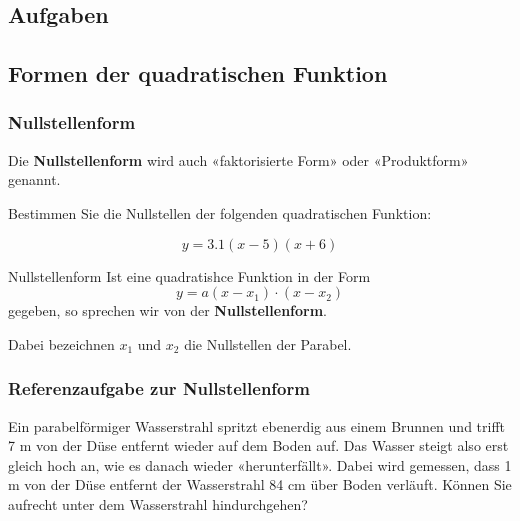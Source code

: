 \subsection*{Aufgaben}

\newpage

\subsection{Formen der quadratischen Funktion}
\subsubsection{Nullstellenform}

Die \textbf{Nullstellenform} wird auch  «faktorisierte Form» oder
«Produktform» genannt.

Bestimmen Sie die Nullstellen der folgenden quadratischen Funktion:

$$y = 3.1(x-5)(x+6)$$





\begin{gesetz}{Nullstellenform}{}
Ist eine quadratishce Funktion in der Form
$$y = a(x-x_1)\cdot{}(x-x_2)$$
gegeben, so sprechen wir von der \textbf{Nullstellenform}.

Dabei bezeichnen  $x_1$ und $x_2$ die Nullstellen der Parabel.
  \end{gesetz}

\newpage


\subsubsection*{Referenzaufgabe zur Nullstellenform}


Ein parabelförmiger Wasserstrahl spritzt ebenerdig aus einem Brunnen
und trifft 7 m von der Düse entfernt wieder auf dem Boden auf.
Das Wasser steigt also erst gleich hoch an, wie es danach wieder «herunterfällt».
Dabei wird gemessen, dass 1 m von der Düse entfernt der Wasserstrahl 84
cm über Boden verläuft.
Können Sie aufrecht unter dem Wasserstrahl hindurchgehen?

